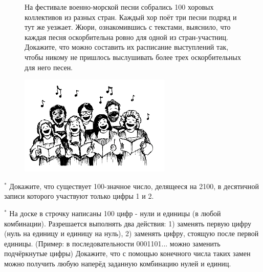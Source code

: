 {\setlength{\intextsep}{2pt}
\begin{figure}[h]
\begin{minipage}{0.65\linewidth}\setlength{\parindent}{1.5em}
\begin{thm}
На фестивале военно-морской песни собрались 100 хоровых коллективов из разных стран. Каждый хор поёт три песни подряд и тут же уезжает. Жюри, ознакомившись с текстами, выяснило, что каждая песня оскорбительна ровно для одной из стран-участниц. Докажите, что можно составить их расписание выступлений так, чтобы никому не пришлось выслушивать более трех оскорбительных для него песен.
\end{thm}
\end{minipage}
\hfill
\begin{minipage}{0.30\linewidth}
    \includegraphics[width=0.95\columnwidth]{img/hor.png}
\end{minipage}
\end{figure}}

\begin{thm}$^{\ast}$
Докажите, что существует 100-значное число, делящееся на 2100, в десятичной записи которого участвуют только цифры 1 и 2.
\end{thm}

\begin{thm}$^{\ast}$
На доске в строчку написаны 100 цифр - нули и единицы (в любой комбинации). Разрешается выполнять два действия: 1) заменять первую цифру (нуль на единицу и единицу на нуль), 2) заменять цифру, стоящую после первой единицы. (Пример: в последовательности 0001101... можно заменить подчёркнутые цифры) Докажите, что с помощью конечного числа таких замен можно получить любую наперёд заданную комбинацию нулей и единиц. 
\end{thm}

